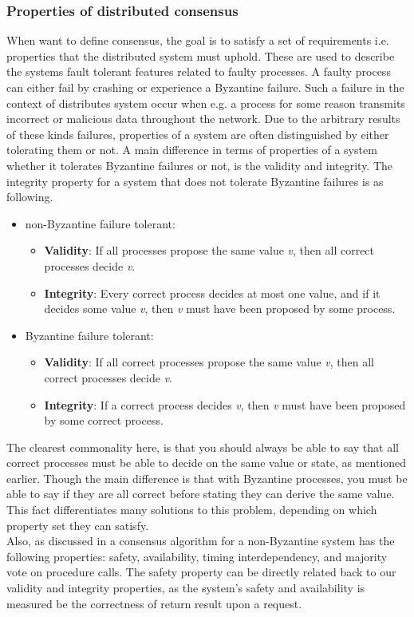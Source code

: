\subsubsection{Properties of distributed consensus}
When want to define consensus, the goal is to satisfy a set of requirements i.e. properties that the distributed system must uphold. These are used to describe the systems fault tolerant features related to faulty processes. A faulty process can either fail by crashing or experience a Byzantine failure. Such a failure in the context of distributes system occur when e.g. a process for some reason transmits incorrect or malicious data throughout the network. Due to the arbitrary results of these kinds failures, properties of a system are often distinguished by either tolerating them or not. A main difference in terms of properties of a system whether it tolerates Byzantine failures or not, is the validity and integrity. The integrity property for a system that does not tolerate Byzantine failures is as following\cite{DistributedSystems}.

\begin{itemize}
\item non-Byzantine failure tolerant:
	\begin{itemize}
	\item \textbf{Validity}: If all processes propose the same value \textit{v}, then all correct processes decide \textit{v}.
	\item \textbf{Integrity}: Every correct process decides at most one value, and if it decides some value \textit{v}, then \textit{v} must have been proposed by some process.
	\end{itemize}
\item Byzantine failure tolerant:
	\begin{itemize}
	\item \textbf{Validity}: If all correct processes propose the same value \textit{v}, then all correct processes decide \textit{v}.
	\item \textbf{Integrity}: If a correct process decides \textit{v}, then \textit{v} must have been proposed by some correct process.
	\end{itemize}
\end{itemize}

The clearest commonality here, is that you should always be able to say that all correct processes must be able to decide on the same value or state, as mentioned earlier. Though the main difference is that with Byzantine processes, you must be able to say if they are all correct before stating they can derive the same value. This fact differentiates many solutions to this problem, depending on which property set they can satisfy. \\
Also, as discussed in \cite{Raft} a consensus algorithm for a non-Byzantine system has the following properties: safety, availability, timing interdependency, and majority vote on procedure calls. The safety property can be directly related back to our validity and integrity properties, as the system's safety and availability is measured be the correctness of return result upon a request.

